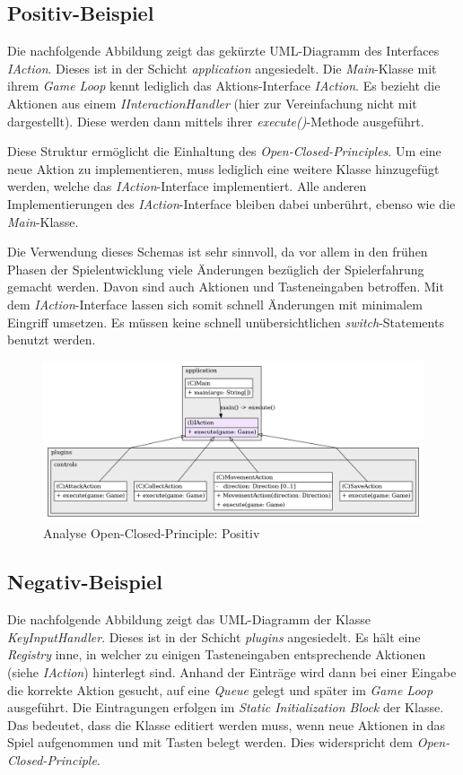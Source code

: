 \subsection{Positiv-Beispiel}
Die nachfolgende Abbildung zeigt das gekürzte UML-Diagramm des Interfaces
\textit{IAction}. Dieses ist in der Schicht \textit{application}
angesiedelt. Die \textit{Main}-Klasse mit ihrem \textit{Game Loop}
kennt lediglich das Aktions-Interface \textit{IAction}. Es bezieht
die Aktionen aus einem \textit{IInteractionHandler} (hier zur
Vereinfachung nicht mit dargestellt). Diese werden dann mittels
ihrer \textit{execute()}-Methode ausgeführt. 

Diese Struktur ermöglicht die Einhaltung des
\textit{Open-Closed-Principles}. Um eine neue Aktion zu implementieren,
muss lediglich eine weitere Klasse hinzugefügt werden, welche das 
\textit{IAction}-Interface implementiert. Alle anderen Implementierungen
des \textit{IAction}-Interface bleiben dabei unberührt, ebenso wie die
\textit{Main}-Klasse.

Die Verwendung dieses Schemas ist sehr sinnvoll, da vor allem in den
frühen Phasen der Spielentwicklung viele Änderungen bezüglich der
Spielerfahrung gemacht werden. Davon sind auch Aktionen und
Tasteneingaben betroffen. Mit dem \textit{IAction}-Interface lassen
sich somit schnell Änderungen mit minimalem Eingriff umsetzen. Es
müssen keine schnell unübersichtlichen \textit{switch}-Statements
benutzt werden. 

\vspace{0.2cm}
\begin{figure}[H]
    \centering
    \includegraphics[width=1\linewidth]{Bilder/Visualisierung/IAction_structure.png}
    \caption{Analyse Open-Closed-Principle: Positiv}
\end{figure}

\subsection{Negativ-Beispiel}
Die nachfolgende Abbildung zeigt das UML-Diagramm der Klasse
\textit{KeyInputHandler}. Dieses ist in der Schicht \textit{plugins}
angesiedelt. Es hält eine \textit{Registry} inne, in welcher zu einigen
Tasteneingaben entsprechende Aktionen (siehe \textit{IAction}) 
hinterlegt sind. Anhand der Einträge wird dann bei einer Eingabe die
korrekte Aktion gesucht, auf eine \textit{Queue} gelegt und später im
\textit{Game Loop} ausgeführt. Die Eintragungen erfolgen im
\textit{Static Initialization Block} der Klasse. Das bedeutet, dass
die Klasse editiert werden muss, wenn neue Aktionen in das Spiel
aufgenommen und mit Tasten belegt werden. Dies widerspricht dem 
\textit{Open-Closed-Principle}.

